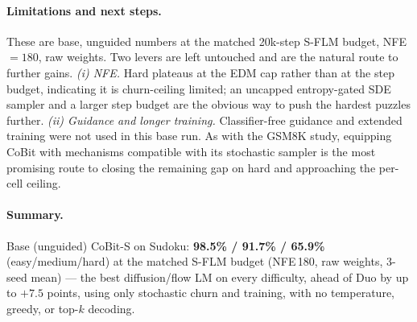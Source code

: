 \documentclass[11pt]{article}
\begin{document}
\paragraph{Limitations and next steps.} These are base, unguided numbers at the matched 20k-step S-FLM
budget, NFE\,$=180$, raw weights. Two levers are left untouched and are the natural route to further gains.
\emph{(i) NFE.} Hard plateaus at the EDM cap rather than at the step budget, indicating it is churn-ceiling
limited; an uncapped entropy-gated SDE sampler and a larger step budget are the obvious way to push the
hardest puzzles further. \emph{(ii) Guidance and longer training.} Classifier-free guidance and extended
training were not used in this base run. As with the GSM8K study, equipping CoBit with mechanisms compatible
with its stochastic sampler is the most promising route to closing the remaining gap on hard and approaching
the per-cell ceiling.

\paragraph{Summary.} Base (unguided) CoBit-S on Sudoku: \textbf{98.5\% / 91.7\% / 65.9\%}
(easy/medium/hard) at the matched S-FLM budget (NFE\,180, raw weights, 3-seed mean) --- the best
diffusion/flow LM on every difficulty, ahead of Duo by up to $+7.5$ points, using only stochastic churn and
training, with no temperature, greedy, or top-$k$ decoding.
\end{document}
